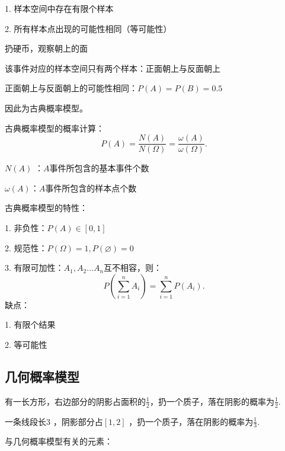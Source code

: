 1. 样本空间中存在有限个样本

2. 所有样本点出现的可能性相同（等可能性）
\begin{eg}
    扔硬币，观察朝上的面

    该事件对应的样本空间只有两个样本：正面朝上与反面朝上

    正面朝上与反面朝上的可能性相同：$P\left( A \right) =P\left( B \right) =0.5$ 

    因此为古典概率模型。
\end{eg}
古典概率模型的概率计算：
\[
    P\left( A \right) =\frac{N\left( A \right) }{N\left( \Omega \right) }= \frac{\omega\left( A \right) }{\omega\left( \Omega \right) }
.\] 
\begin{notation}
    $N\left( A \right) $ ：$A$事件所包含的基本事件个数

    $\omega\left( A \right)$：$A$事件所包含的样本点个数
\end{notation}
\begin{notation}
    古典概率模型的特性：

    1. 非负性：$P\left( A \right) \in \left[ 0,1 \right] $
    
    2. 规范性：$P\left( \Omega \right) =1,P\left( \varnothing \right) =0$

    3. 有限可加性：$A_1,A_2\ldots A_n$互不相容，则：\[
        P\left( \sum_{i=1}^{n} A_i \right) =\sum_{i=1}^{n} P\left( A_i \right) 
    .\] 
    缺点：

    1. 有限个结果

    2. 等可能性
\end{notation}
\subsection{几何概率模型}%
\label{sub: 几何概率模型}
\begin{eg}
    有一长方形，右边部分的阴影占面积的$\frac{1}{2}$，扔一个质子，落在阴影的概率为$\frac{1}{2}$.
\end{eg}
\begin{center}
\end{center}
\begin{eg}
     一条线段长$3$ ，阴影部分占$\left[ 1,2 \right] $ ，扔一个质子，落在阴影的概率为$\frac{1}{3}$.
\end{eg}
\begin{center}
\end{center}
与几何概率模型有关的元素：

